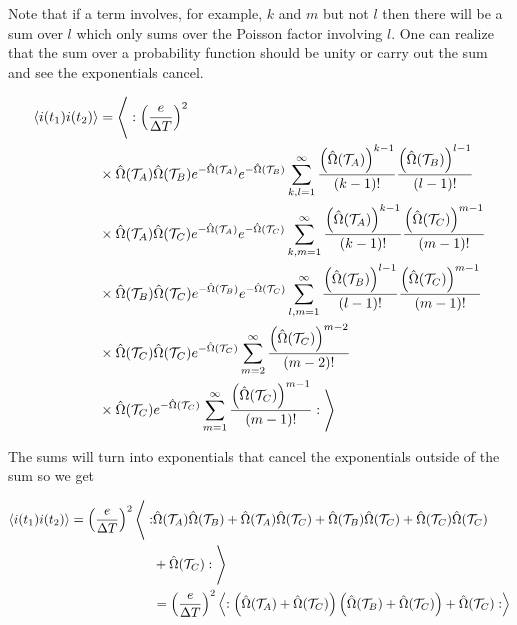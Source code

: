 \documentclass[12pt]{article}
\newcommand{\mc}[1]{\mathcal{#1}}
\begin{document}
Note that if a term involves, for example, $k$ and $m$ but not $l$ then there will be a sum over $l$ which only sums over the Poisson factor involving $l$. One can realize that the sum over a probability function should be unity or carry out the sum and see the exponentials cancel.

\begin{align}
\Braket{i(t_1)i(t_2)} &= \Bigg \langle: \left(\frac{e}{\Delta T}\right)^2 \\
&\times \hat{\Omega}(\mc{T}_A)\hat{\Omega}(\mc{T}_B) e^{-\hat{\Omega}(\mc{T}_A)}e^{-\hat{\Omega}(\mc{T}_B)}\sum_{k,l=1}^{\infty} \frac{\left(\hat{\Omega}(\mc{T}_A)\right)^{k-1}}{(k-1)!}\frac{\left(\hat{\Omega}(\mc{T}_B)\right)^{l-1}}{(l-1)!}\\
&\times \hat{\Omega}(\mc{T}_A)\hat{\Omega}(\mc{T}_C) e^{-\hat{\Omega}(\mc{T}_A)}e^{-\hat{\Omega}(\mc{T}_C)}\sum_{k,m=1}^{\infty} \frac{\left(\hat{\Omega}(\mc{T}_A)\right)^{k-1}}{(k-1)!}\frac{\left(\hat{\Omega}(\mc{T}_C)\right)^{m-1}}{(m-1)!}\\
&\times \hat{\Omega}(\mc{T}_B)\hat{\Omega}(\mc{T}_C) e^{-\hat{\Omega}(\mc{T}_B)}e^{-\hat{\Omega}(\mc{T}_C)}\sum_{l,m=1}^{\infty} \frac{\left(\hat{\Omega}(\mc{T}_B)\right)^{l-1}}{(l-1)!}\frac{\left(\hat{\Omega}(\mc{T}_C)\right)^{m-1}}{(m-1)!}\\
&\times \hat{\Omega}(\mc{T}_C)\hat{\Omega}(\mc{T}_C) e^{-\hat{\Omega}(\mc{T}_C)}\sum_{m=2}^{\infty} \frac{\left(\hat{\Omega}(\mc{T}_C)\right)^{m-2}}{(m-2)!}\\
&\times \hat{\Omega}(\mc{T}_C) e^{-\hat{\Omega}(\mc{T}_C)}\sum_{m=1}^{\infty} \frac{\left(\hat{\Omega}(\mc{T}_C)\right)^{m-1}}{(m-1)!} : \Bigg \rangle
\end{align}

The sums will turn into exponentials that cancel the exponentials outside of the sum so we get

\begin{align}
\Braket{i(t_1)i(t_2)} = \left( \frac{e}{\Delta T} \right)^2 \Bigg \langle:&\hat{\Omega}(\mc{T}_A)\hat{\Omega}(\mc{T}_B)  + \hat{\Omega}(\mc{T}_A)\hat{\Omega}(\mc{T}_C)  + \hat{\Omega}(\mc{T}_B)\hat{\Omega}(\mc{T}_C)  + \hat{\Omega}(\mc{T}_C)\hat{\Omega}(\mc{T}_C)\\
& + \hat{\Omega}(\mc{T}_C)  :\Bigg \rangle\\
&= \left(\frac{e}{\Delta T} \right)^2 \Braket{:\left(\hat{\Omega}(\mc{T}_A)+\hat{\Omega}(\mc{T}_C)\right)\left(\hat{\Omega}(\mc{T}_B)+\hat{\Omega}(\mc{T}_C) \right) + \hat{\Omega}(\mc{T}_C):}
\end{align}
\end{document}
